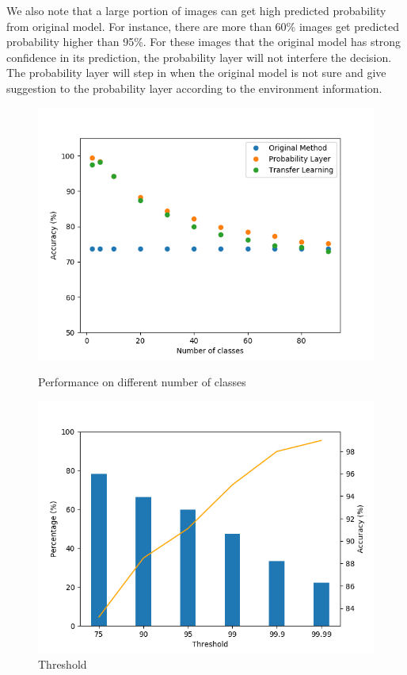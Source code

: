 \documentclass{article}
\begin{document}
We also note that a large portion of images can get high predicted probability from original model. For instance, there are more than 60\% images get predicted probability higher than 95\%. For these images that the original model has strong confidence in its prediction, the probability layer will not interfere the decision. The probability layer will step in when the original model is not sure and give suggestion to the probability layer according to the environment information. 


\begin{figure}[!tbp]
\RawFloats

  \centering
  \begin{minipage}[b]{0.49\textwidth}
        \centering
        \includegraphics[width=\textwidth]{PLvsRetrain.png}
        \caption{Performance on different number of classes}
        \label{fig:PLvsRetrain}
  \end{minipage}
  \hfill
  \begin{minipage}[b]{0.49\textwidth}
        \centering
        \includegraphics[width=\textwidth]{threshold.png}
        \caption{Threshold}
        \label{fig:threshold}
  \end{minipage}
\end{figure}
\end{document}
